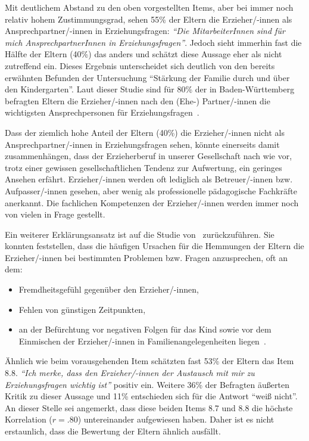 \documentclass[12pt,a4paper]{article}
\begin{document}
Mit deutlichem Abstand zu den oben vorgestellten Items, aber bei immer noch relativ hohem Zustimmungsgrad, sehen 55\% der Eltern die Erzieher/-innen als Ansprechpartner/-innen in Erziehungsfragen: \textit{"`Die MitarbeiterInnen sind für mich AnsprechpartnerInnen in Erziehungsfragen"'}. Jedoch sieht immerhin fast die Hälfte der Eltern (40\%) das anders und schätzt diese Aussage eher als nicht zutreffend ein. Dieses Ergebnis unterscheidet sich deutlich von den bereits 
erwähnten Befunden der Untersuchung "`Stärkung der Familie durch und über den Kindergarten"'. Laut dieser Studie sind für 80\% der in Baden-Württemberg befragten Eltern die Erzieher/-innen nach den (Ehe-) Partner/-innen die wichtigsten Ansprechpersonen für Erziehungsfragen~\parencite[S.~10]{Froelich}. 
 
Dass der ziemlich hohe Anteil der Eltern (40\%) die Erzieher/-innen nicht als Ansprechpartner/-innen in Erziehungsfragen sehen, könnte einerseits damit zusammenhängen, dass der Erzieherberuf in unserer Gesellschaft nach wie vor, trotz einer gewissen gesellschaftlichen Tendenz zur Aufwertung, ein geringes Ansehen erfährt. Erzieher/-innen werden oft lediglich als Betreuer/-innen bzw. Aufpasser/-innen gesehen, aber wenig als professionelle pädagogische Fachkräfte anerkannt. Die fachlichen Kompetenzen der Erzieher/-innen werden immer noch von vielen in Frage gestellt. 

Ein weiterer Erklärungsansatz ist auf die Studie von~\textcite{Sturzbecher} zurückzuführen. Sie konnten feststellen, dass die häufigen Ursachen für die Hemmungen der Eltern die Erzieher/-innen bei bestimmten Problemen bzw. Fragen anzusprechen, oft an dem: 
\begin{itemize} 
\item Fremdheitsgefühl gegenüber den Erzieher/-innen, 
\item Fehlen von günstigen Zeitpunkten, 
\item an der Befürchtung vor negativen Folgen für das Kind sowie vor dem Einmischen der Erzieher/-innen in Familienangelegenheiten liegen~\parencite[S.~193-233]{Sturzbecher}.
\end{itemize}

	Ähnlich wie beim vorausgehenden Item schätzten fast 53\% der Eltern das Item 8.8. \textit{"`Ich merke, dass den Erzieher/-innen der Austausch mit mir zu Erziehungsfragen wichtig ist"'} positiv ein. Weitere 36\% der Befragten äußerten Kritik zu dieser Aussage und 11\% entschieden sich für die Antwort "`weiß nicht"'. An dieser Stelle sei angemerkt, dass diese beiden Items 8.7 und 8.8 die höchste Korrelation ($r = .80$) untereinander aufgewiesen haben. Daher ist es nicht erstaunlich, dass die Bewertung der Eltern ähnlich ausfällt. 
\end{document}

